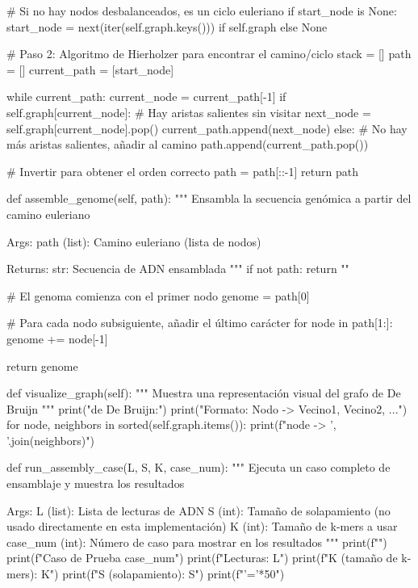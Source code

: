 \documentclass[fleqn,10pt]{article}
\begin{document}
        # Si no hay nodos desbalanceados, es un ciclo euleriano
        if start_node is None:
            start_node = next(iter(self.graph.keys())) if self.graph else None
        
        # Paso 2: Algoritmo de Hierholzer para encontrar el camino/ciclo
        stack = []
        path = []
        current_path = [start_node]
        
        while current_path:
            current_node = current_path[-1]
            if self.graph[current_node]:
                # Hay aristas salientes sin visitar
                next_node = self.graph[current_node].pop()
                current_path.append(next_node)
            else:
                # No hay más aristas salientes, añadir al camino
                path.append(current_path.pop())
        
        # Invertir para obtener el orden correcto
        path = path[::-1]
        return path

    def assemble_genome(self, path):
        """
        Ensambla la secuencia genómica a partir del camino euleriano
        
        Args:
            path (list): Camino euleriano (lista de nodos)
            
        Returns:
            str: Secuencia de ADN ensamblada
        """
        if not path:
            return ""
        
        # El genoma comienza con el primer nodo
        genome = path[0]
        
        # Para cada nodo subsiguiente, añadir el último carácter
        for node in path[1:]:
            genome += node[-1]
            
        return genome

    def visualize_graph(self):
        """
        Muestra una representación visual del grafo de De Bruijn
        """
        print("\nGrafo de De Bruijn:")
        print("Formato: Nodo -> Vecino1, Vecino2, ...")
        for node, neighbors in sorted(self.graph.items()):
            print(f"{node} -> {', '.join(neighbors)}")


def run_assembly_case(L, S, K, case_num):
    """
    Ejecuta un caso completo de ensamblaje y muestra los resultados
    
    Args:
        L (list): Lista de lecturas de ADN
        S (int): Tamaño de solapamiento (no usado directamente en esta implementación)
        K (int): Tamaño de k-mers a usar
        case_num (int): Número de caso para mostrar en los resultados
    """
    print(f"")
    print(f"Caso de Prueba {case_num}")
    print(f"Lecturas: {L}")
    print(f"K (tamaño de k-mers): {K}")
    print(f"S (solapamiento): {S}")
    print(f"{'='*50}")
    
\end{document}
